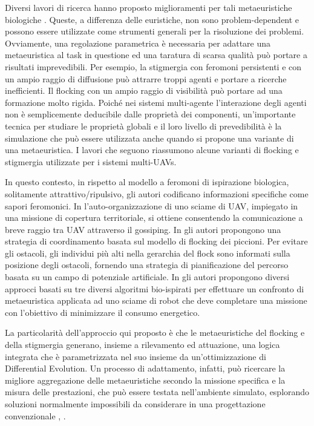 Diversi lavori di ricerca hanno proposto miglioramenti per tali metaeuristiche biologiche \cite{bayindir2016review}. 
Queste, a differenza delle euristiche, non sono problem-dependent e possono essere utilizzate come strumenti generali per la risoluzione dei problemi. 
Ovviamente, una regolazione parametrica è necessaria per adattare una metaeuristica al task in questione ed una taratura di scarsa qualità può portare a risultati imprevedibili. 
Per esempio, la stigmergia con feromoni persistenti e con un ampio raggio di diffusione può attrarre troppi agenti e portare a ricerche inefficienti. 
Il flocking con un ampio raggio di visibilità può portare ad una formazione molto rigida. 
Poiché nei sistemi multi-agente l'interazione degli agenti non è semplicemente deducibile dalle proprietà dei componenti, un'importante tecnica per studiare le proprietà globali e il loro livello di prevedibilità è la simulazione che può essere utilizzata anche quando si propone una variante di una metaeuristica. 
I lavori che seguono riassumono alcune varianti di flocking e stigmergia utilizzate per i sistemi multi-UAVs.

In questo contesto, in \cite{paradzik2016multi} rispetto al modello a feromoni di ispirazione biologica, solitamente attrattivo/ripulsivo, gli autori codificano informazioni specifiche come sapori feromonici. 
In \cite{de2017fault} l'auto-organizzazione di uno sciame di UAV, impiegato in una missione di copertura territoriale, si ottiene consentendo la comunicazione a breve raggio tra UAV attraverso il gossiping. 
In \cite{qiu2017pigeon} gli autori propongono una strategia di coordinamento basata sul modello di flocking dei piccioni. 
Per evitare gli ostacoli, gli individui più alti nella gerarchia del flock sono informati sulla posizione degli ostacoli, fornendo una strategia di pianificazione del percorso basata su un campo di potenziale artificiale. 
In \cite{palmieri2017comparison} gli autori propongono diversi approcci basati su tre diversi algoritmi bio-ispirati per effettuare un confronto di metaeuristica applicata ad uno sciame di robot che deve completare una missione con l'obiettivo di minimizzare il consumo energetico.

La particolarità dell'approccio qui proposto è che le metaeuristiche del flocking e della stigmergia generano, insieme a rilevamento ed attuazione, una logica integrata che è parametrizzata nel suo insieme da un'ottimizzazione di Differential Evolution. 
Un processo di adattamento, infatti, può ricercare la migliore aggregazione delle metaeuristiche secondo la missione specifica e la misura delle prestazioni, che può essere testata nell'ambiente simulato, esplorando soluzioni normalmente impossibili da considerare in una progettazione convenzionale \cite{singh2017detection}, \cite{bloembergen2015evolutionary}.

